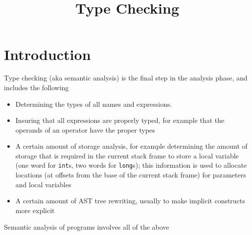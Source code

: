 \documentclass[8pt,a4paper,compress]{beamer}
\title{Type Checking}
\date{}
\begin{document}
\begin{frame}
\vfill
\titlepage
\end{frame}

\section{Introduction}
\begin{frame}[fragile]
\pause

Type checking (aka semantic analysis) is the final step in the analysis phase, and includes the following

\begin{itemize}
\pause
\item Determining the types of all names and expressions.
\pause
\item Insuring that all expressions are properly typed, for example that the operands of an operator have the proper types
\pause
\item A certain amount of storage analysis, for example determining the amount of storage that is required in the current stack frame to store a local variable (one word for \lstinline{int}s, two words for \lstinline{long}s); this information is used to allocate locations (at offsets from the base of the current stack frame) for parameters and local variables
\pause
\item A certain amount of AST tree rewriting, usually to make implicit constructs more explicit
\end{itemize}

\pause
\bigskip

Semantic analysis of \jmm programs involves all of the above
\end{frame}
\end{document}

